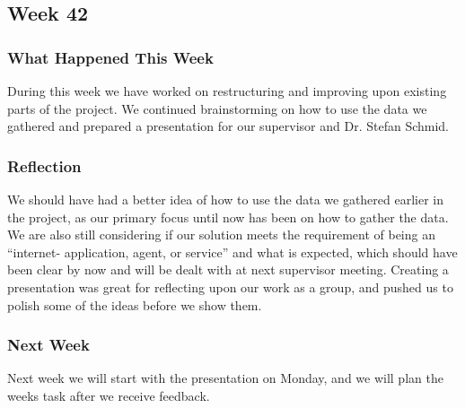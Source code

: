 \subsection{Week 42}
\subsubsection{What Happened This Week} 
During this week we have worked on restructuring and improving upon existing
parts of the project. We continued brainstorming on how to use the data we
gathered and prepared a presentation for our supervisor and Dr. Stefan Schmid.

\subsubsection{Reflection}
We should have had a better idea of how to use the data we gathered earlier in
the project, as our primary focus until now has been on how to gather the data.
We are also still considering if our solution meets the requirement of being an
``internet- application, agent, or service'' and what is expected, which should
have been clear by now and will be dealt with at next supervisor meeting.
Creating a presentation was great for reflecting upon our work as a group, and
pushed us to polish some of the ideas before we show them.

\subsubsection{Next Week}
Next week we will start with the presentation on Monday, and we will plan the
weeks task after we receive feedback.


